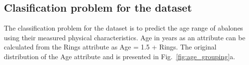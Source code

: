 \documentclass[10pt, paper=a4]{article}
\begin{document}


\subsection{Clasification problem for the dataset}  %
The classification problem for the dataset is to predict the age range
of abalones using their measured physical characteristics.  Age in
years as an attribute can be calculated from the Rings attribute as
Age = 1.5 + Rings.  The original distribution of the Age attribute and
is presented in Fig.~\ref{fig:age_grouping}a.
\end{document}
